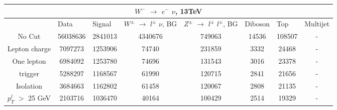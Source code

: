 \documentclass[10pt]{article}
\begin{document}
 										
\begin{center}										
\begin{table}[H] 										
\begin{adjustbox}{width=1\textwidth}								
\begin{tabular}{cccccccc} 									
\\ \hline \hline  										
\multicolumn{8}{c}{$W^{-}$ $\rightarrow$ $e^{-}$ $\nu$, 13TeV}  									
\\ \hline \hline                            						
\multicolumn{1}{|c|}{}   & \multicolumn{1}{l|}{Data} & \multicolumn{1}{l|}{Signal} & \multicolumn{1}{l|}{$W^{\pm}$ $\rightarrow$ $l^{\pm}$ $\nu$, BG} & \multicolumn{1}{l|}{$Z^{\pm}$ $\rightarrow$ $l^{\pm}$ $l^{\pm}$, BG} & \multicolumn{1}{l|}{Diboson} & \multicolumn{1}{l|}{Top} & \multicolumn{1}{l|}{Multijet} \\ \hline 
\multicolumn{1}{|c|}{No Cut}  & \multicolumn{1}{c|}{56038636} & \multicolumn{1}{c|}{2841013} & \multicolumn{1}{c|}{4340676} & \multicolumn{1}{c|}{749063} & \multicolumn{1}{c|}{14536} & \multicolumn{1}{c|}{108507} & \multicolumn{1}{c|}{-}  \\ \hline 
\multicolumn{1}{|c|}{Lepton charge}  & \multicolumn{1}{c|}{7097273} & \multicolumn{1}{c|}{1253906} & \multicolumn{1}{c|}{74740} & \multicolumn{1}{c|}{231859} & \multicolumn{1}{c|}{3332} & \multicolumn{1}{c|}{24468} & \multicolumn{1}{c|}{-}  \\ \hline 
\multicolumn{1}{|c|}{One lepton}  & \multicolumn{1}{c|}{6984092} & \multicolumn{1}{c|}{1253780} & \multicolumn{1}{c|}{74696} & \multicolumn{1}{c|}{131543} & \multicolumn{1}{c|}{3016} & \multicolumn{1}{c|}{23378} & \multicolumn{1}{c|}{-}  \\ \hline 
\multicolumn{1}{|c|}{trigger}  & \multicolumn{1}{c|}{5288297} & \multicolumn{1}{c|}{1168567} & \multicolumn{1}{c|}{61990} & \multicolumn{1}{c|}{120715} & \multicolumn{1}{c|}{2841} & \multicolumn{1}{c|}{21656} & \multicolumn{1}{c|}{-}  \\ \hline 
\multicolumn{1}{|c|}{Isolation}  & \multicolumn{1}{c|}{3684663} & \multicolumn{1}{c|}{1162802} & \multicolumn{1}{c|}{61458} & \multicolumn{1}{c|}{120067} & \multicolumn{1}{c|}{2808} & \multicolumn{1}{c|}{21135} & \multicolumn{1}{c|}{-}  \\ \hline 
\multicolumn{1}{|c|}{$p_{T}^{l}$ $>$ 25 GeV}  & \multicolumn{1}{c|}{2103716} & \multicolumn{1}{c|}{1036470} & \multicolumn{1}{c|}{40164} & \multicolumn{1}{c|}{100429} & \multicolumn{1}{c|}{2514} & \multicolumn{1}{c|}{19329} & \multicolumn{1}{c|}{-}  \\ \hline 

\end{tabular}
\end{adjustbox}
\end{table}
\end{center}
\end{document}
